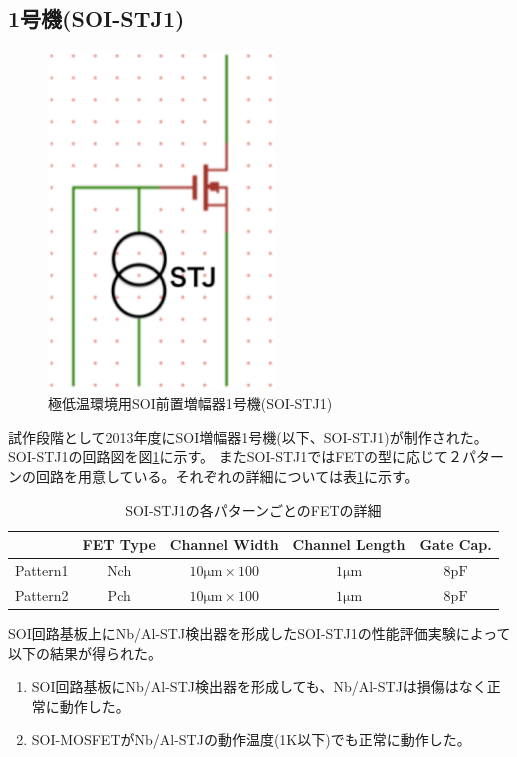 	\subsection{1号機(SOI-STJ1)}
		\begin{figure}[htbp]
			\begin{center}
				\includegraphics[width=6.0cm]{./Chapter/Chapter3/Picture/SOISTJ1_circuit.eps}
				\caption{極低温環境用SOI前置増幅器1号機(SOI-STJ1)}
				\label{fig:SOISTJ1_circuit}
			\end{center}
		\end{figure}
		試作段階として2013年度にSOI増幅器1号機(以下、SOI-STJ1)が制作された。SOI-STJ1の回路図を図\ref{fig:SOISTJ1_circuit}に示す。
		またSOI-STJ1ではFETの型に応じて２パターンの回路を用意している。それぞれの詳細については表\ref{tab:SOISTJ1_detail}に示す。
		\begin{table}[htb]
			\begin{center}
				\begin{tabular}{| l || c | c | c | c |} \hline
					\  & FET Type & Channel Width & Channel Length & Gate Cap. \\ \hline \hline
					Pattern1 & Nch & $10\mathrm{\mu m} \times 100$ & $1 \mathrm{\mu m}$ & $8 \mathrm{pF}$ \\ \hline
					Pattern2 & Pch & $10\mathrm{\mu m} \times 100$ & $1 \mathrm{\mu m}$ & $8 \mathrm{pF}$ \\ \hline
				\end{tabular}
				\caption{SOI-STJ1の各パターンごとのFETの詳細}
				\label{tab:SOISTJ1_detail}
			\end{center}
		\end{table}
		SOI回路基板上にNb/Al-STJ検出器を形成したSOI-STJ1の性能評価実験によって以下の結果が得られた。
		\begin{enumerate}
			\item SOI回路基板にNb/Al-STJ検出器を形成しても、Nb/Al-STJは損傷はなく正常に動作した。
			\item SOI-MOSFETがNb/Al-STJの動作温度(1K以下)でも正常に動作した。
		\end{enumerate}
